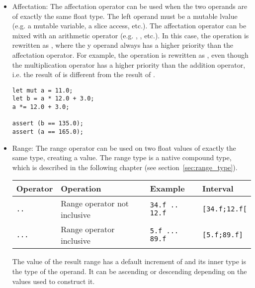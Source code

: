 \begin{itemize}
\item Affectation: The affectation operator \token{=} can be used when the two
  operands are of exactly the same float type. The left operand must be a
  mutable lvalue (e.g. a mutable variable, a slice access, etc.). The
  affectation operator can be mixed with an arithmetic operator (e.g.
  \token{+=}, \token{/=}, etc.). In this case, the operation 
  is rewritten as , where the y operand always has a higher
  priority than the affectation operator. For example, the operation  is rewritten as , even though the
  multiplication operator has a higher priority than the addition operator, i.e.
  the result of  is different from the result of
  .

  \begin{lstlisting}[style=coloredverbatim]
let mut a = 11.0;
let b = a * 12.0 + 3.0;
a *= 12.0 + 3.0;

assert (b == 135.0);
assert (a == 165.0);
  \end{lstlisting}

\item Range: The range operator can be used on two float values of exactly the
  same type, creating a  value. The range type is a native
  compound type, which is described in the following chapter (see
  section~\ref{sec:range_type}).

  \begin{center}
    \begin{adjustbox}{max width=1.0\linewidth}
      \begin{tabular}{|l|lll|}
        \hline
        Operator & Operation & Example & Interval\\[0pt]
        \hline
        \hline
        \texttt{..} & Range operator not inclusive & \texttt{34.f .. 12.f} & \texttt{[34.f;12.f[}\\[0pt]
            \texttt{...} & Range operator inclusive & \texttt{5.f ... 89.f} & \texttt{[5.f;89.f]}\\[0pt]
            \hline
      \end{tabular}
    \end{adjustbox}
  \end{center}


  The value of the result range has a default increment of  and its
  inner type is the type of the operand. It can be ascending or descending
  depending on the values used to construct it.

\end{itemize}

